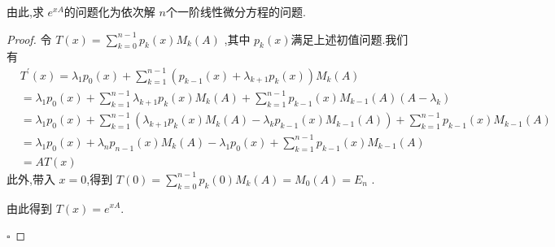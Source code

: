 \documentclass[lang=cn,12pt,color=green,fontset=none]{elegantbook}
\begin{document}
\begin{remark}
    由此,求 \(  e^{xA}  \)的问题化为依次解 \(  n  \)个一阶线性微分方程的问题.  
\end{remark}
\begin{proof}
    令 \(  T\left( x \right)=\sum _{k=0}^{n-1}p_k\left( x \right)M_k\left( A \right)      \) ,其中 \(  p_{k}\left( x \right)   \)满足上述初值问题.我们有 \[
    \begin{aligned}
   & T^{\prime} \left( x \right)= \lambda_1p_0\left( x \right)+ \sum _{k=1}^{n-1}\left( p_{k-1}\left( x \right)+ \lambda_{k+ 1}p_k\left( x \right)   \right)M_k\left( A \right)     \\ 
    &  = \lambda_1p_0\left( x \right)+  \sum _{k=1}^{n-1}\lambda_{k+ 1}p_k\left( x \right)M_k\left( A \right)+ \sum _{k=1}^{n-1}p_{k-1}\left( x \right)M_{k-1}\left( A \right)\left( A-\lambda_{k} \right)\\ 
  &  = \lambda_1p_0\left( x \right)+ \sum _{k=1}^{n-1}\left( \lambda_{k+ 1}p_k\left( x \right)M_k\left( A \right)-\lambda_kp_{k-1}\left( x \right)M_{k-1}\left( A \right)     \right)+ \sum _{k=1}^{n-1}p_{k-1}\left( x \right)M_{k-1}\left( A \right)\\ 
   &  =  \lambda_1p_0\left( x \right)+ \lambda_{n}p_{n-1}\left( x \right)M_k\left( A \right)-\lambda_1p_0\left( x \right)+ \sum _{k=1}^{n-1}p_{k-1}\left( x \right)M_{k-1}\left( A \right)\\ 
    & = AT\left( x \right)       
    \end{aligned}
    \] 此外,带入 \(  x=0  \),得到 \(  T\left( 0 \right)= \sum _{k=0}^{n-1}p_{k}\left( 0 \right)M_{k}\left( A \right)=M_0\left( A \right)=E_{n}      \)  .

    由此得到 \(  T\left( x \right)=e^{xA}   \). 
    
    \hfill $\square$
\end{proof}
\end{document}
